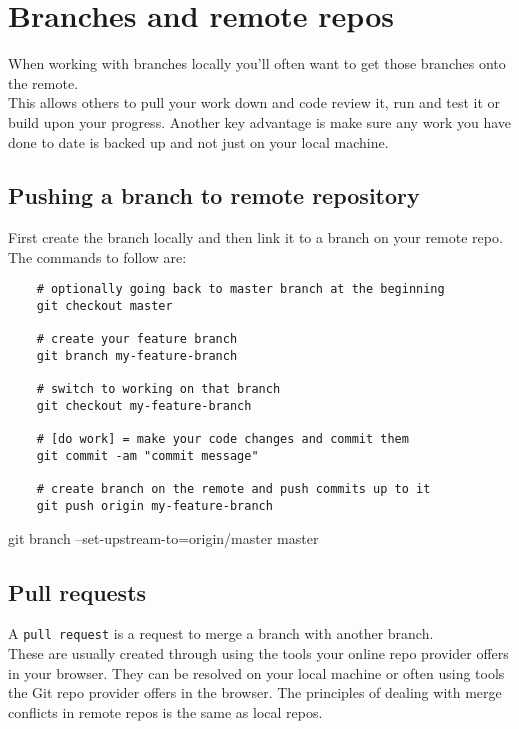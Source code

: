 \section{Branches and remote repos}

When working with branches locally you'll often want to get those branches onto the remote.
\\

This allows others to pull your work down and code review it, run and test it or build upon your progress. Another key advantage is make sure any work you have done to date is backed up and not just on your local machine.
\\

\subsection{Pushing a branch to remote repository}

First create the branch locally and then link it to a branch on your remote repo.
\\

The commands to follow are:

\begin{verbatim}
    # optionally going back to master branch at the beginning
    git checkout master

    # create your feature branch
    git branch my-feature-branch 

    # switch to working on that branch
    git checkout my-feature-branch 

    # [do work] = make your code changes and commit them
    git commit -am "commit message" 

    # create branch on the remote and push commits up to it
    git push origin my-feature-branch
\end{verbatim}

git branch --set-upstream-to=origin/master master


\subsection{Pull requests}

A \texttt{pull request} is a request to merge a branch with another branch.
\\

These are usually created through using the tools your online repo provider offers in your browser. They can be resolved on your local machine or often using tools the Git repo provider offers in the browser. The principles of dealing with merge conflicts in remote repos is the same as local repos.
\\

